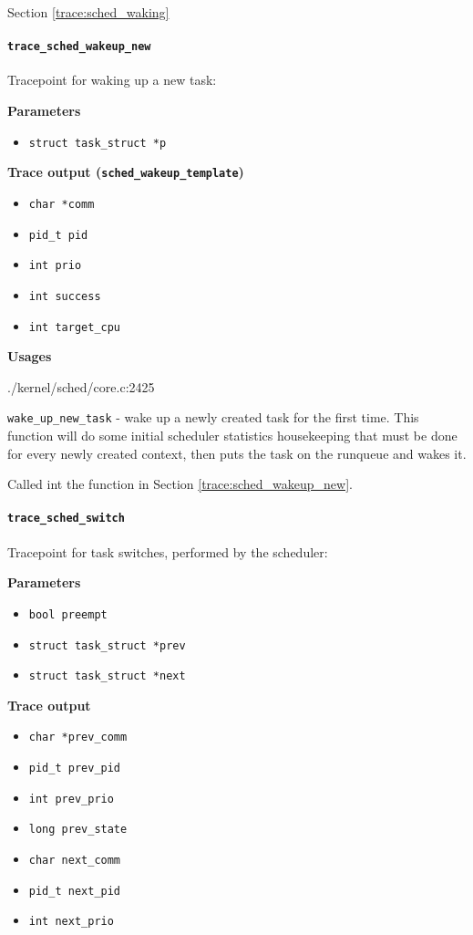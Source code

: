 Section \ref{trace:sched_waking}

\paragraph{\texttt{trace\_sched\_wakeup\_new}}
Tracepoint for waking up a new task:

\textbf{Parameters}
\begin{itemize}
    \item \verb|struct task_struct *p|
\end{itemize}

\textbf{Trace output (\texttt{sched\_wakeup\_template})}
\begin{itemize}
    \item \verb|char *comm|
    \item \verb|pid_t pid|
    \item \verb|int prio|
    \item \verb|int success|
    \item \verb|int target_cpu|
\end{itemize}

\textbf{Usages}
\begin{code}
./kernel/sched/core.c:2425
\end{code}
\verb|wake_up_new_task| - wake up a newly created task for the first time.
This function will do some initial scheduler statistics housekeeping
that must be done for every newly created context, then puts the task
on the runqueue and wakes it.

Called int the \verb|| function in Section \ref{trace:sched_wakeup_new}.
   
\paragraph{\texttt{trace\_sched\_switch}}
Tracepoint for task switches, performed by the scheduler:

\textbf{Parameters}
\begin{itemize}
    \item \verb|bool preempt|
    \item \verb|struct task_struct *prev|
    \item \verb|struct task_struct *next|
\end{itemize}

\textbf{Trace output}
\begin{itemize}
    \item \verb|char *prev_comm|
    \item \verb|pid_t prev_pid|
    \item \verb|int prev_prio|
    \item \verb|long prev_state|
    \item \verb|char next_comm|
    \item \verb|pid_t next_pid|
    \item \verb|int next_prio|
\end{itemize}

